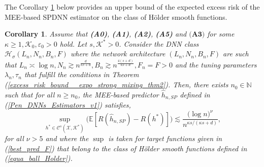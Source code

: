 \documentclass[10pt,twoside]{article}
\numberwithin{equation}{section}
\newtheorem{Corol}[thm]{Corollary}
\newcommand{\E}{\ensuremath{\mathbb{E}}}
\newcommand{\N}{\ensuremath{\mathbb{N}}}
\newcommand{\mk}{ { \mathcal{K}} }
\begin{document}
\medskip

\noindent
The Corollary \ref{excess_risk_bound_class_of_Holder_function_V1} below provides an upper bound of the expected excess risk of the MEE-based SPDNN estimator on the class of H\"older smooth functions.
 
\medskip

\begin{Corol}\label{excess_risk_bound_class_of_Holder_function_V1}
%
Assume that \textbf{(A0)}, \textbf{(A1)}, \textbf{(A2)}, \textbf{(A5)} and $\textbf{(A3)}$ for some $\kappa \ge 1, \mk_0, \varepsilon_0 > 0$ hold.
Let $s, \mathcal{K}^{*} > 0$.
Consider the DNN class $\mathcal{H}_{\sigma}(L_n, N_n, B_n, F)$ where the network architecture $(L_n, N_n, B_n, F)$ are such that $L_n \asymp \log n, N_n \gtrsim n^{\frac{d}{\kappa s + d}}, B_n \gtrsim n^{\frac{4(s + d)}{\kappa s + d}}, F_n = F >0$ and the tuning parameters $\lambda_n, \tau_n$ that fulfill the conditions in Theorem (\ref{excess_risk_bound__expo_strong_mixing_thm2}).
%
Then, there exists $n_0 \in \N$ such that for all $n \geq n_0$, the MEE-based predictor $\widehat{h}_{n,SP}$ defined in (\ref{Pen_DNNs_Estimators_v1}) satisfies,
%
\begin{equation}\label{excess_risk_bound_v1}
 \sup_{h^{*} \in \mathcal{C}^{s}(\mathcal{X}, \mathcal{K}^{*}) } \Big(  \E[R(\widehat{h}_{n,SP}) - R(h^{*})] \Big) \lesssim \dfrac{  \big(\log n \big)^{\nu} }{n^{\kappa s/(\kappa s + d)}},
\end{equation}
%
for all $\nu > 5$ and where the $\sup$ is taken for target functions given in (\ref{best_pred_F}) that belong to the class of H\"older smooth functions defined in (\ref{equa_ball_Holder}).
 
\end{Corol}

\medskip
\end{document}
